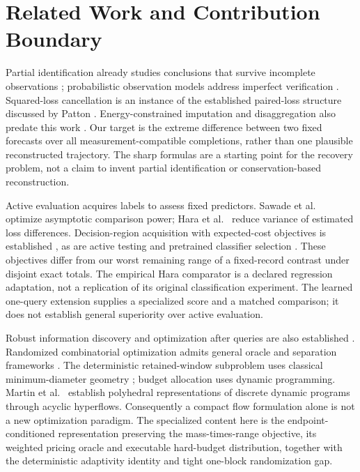 \documentclass[12pt]{article}
\begin{document}
\section{Related Work and Contribution Boundary}
Partial identification already studies conclusions that survive incomplete
observations \cite{manski,polo}; probabilistic observation models address
imperfect verification \cite{bessac}. Squared-loss cancellation is an
instance of the established paired-loss structure discussed by Patton
\cite{patton}. Energy-constrained imputation and disaggregation also predate
this work \cite{cpi,hu,heat}. Our target is the extreme difference between
two fixed forecasts over all measurement-compatible completions, rather
than one plausible reconstructed trajectory. The sharp formulas are a
starting point for the recovery problem, not a claim to invent partial
identification or conservation-based reconstruction.

Active evaluation acquires labels to assess fixed predictors.
Sawade et al.\ \cite{sawade} optimize asymptotic comparison power;
Hara et al.\ \cite{hara} reduce variance of estimated loss differences.
Decision-region acquisition with expected-cost objectives is established
\cite{javdani2014}, as are active testing and pretrained classifier
selection \cite{active,okanovic2025}. These objectives differ from our
worst remaining range of a fixed-record contrast under disjoint exact
totals. The empirical Hara comparator is a declared regression adaptation,
not a replication of its original classification experiment. The learned
one-query extension supplies a specialized score and a matched comparison;
it does not establish general superiority over active evaluation.

Robust information discovery and optimization after queries are also
established \cite{ddid,chen2026}. Randomized combinatorial optimization
admits general oracle and separation frameworks \cite{kawase2024}.
The deterministic retained-window subproblem uses classical
minimum-diameter geometry \cite{aggarwal}; budget allocation uses dynamic
programming. Martin et al.\ \cite{martin1990} establish polyhedral
representations of discrete dynamic programs through acyclic hyperflows.
Consequently a compact flow formulation alone is not a new optimization
paradigm. The specialized content here is the endpoint-conditioned
representation preserving the mass-times-range objective, its weighted
pricing oracle and executable hard-budget distribution, together with
the deterministic adaptivity identity and tight one-block randomization
gap.
\end{document}
